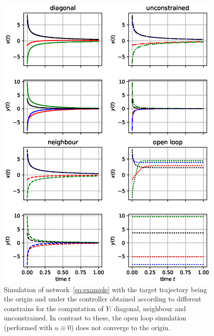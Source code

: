 \documentclass[10pt,twocolumn,twoside]{IEEEtran}
\theoremstyle{plain}
\theoremstyle{definition}
\theoremstyle{remark}
\begin{document}
\begin{figure}[htpb!]
	\centering
	\includegraphics[width=\linewidth]{./imgs/simulation.eps}

	\caption{Simulation of network~\eqref{eq:example} with the target trajectory being the origin and under the controller obtained according to different constrains for the computation of $Y$: diagonal, neighbour and unconstrained. In contrast to these, the open loop simulation (performed with $u\equiv0$) does not converge to the origin.}
	\label{fig:3dsim}
\end{figure}
\end{document}
